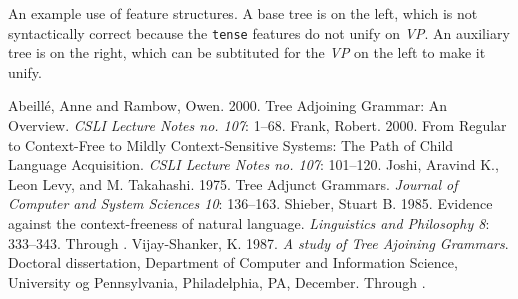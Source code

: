 \documentclass[12pt]{article}
\begin{document}
\begin{Figure}
\begin{center}
\end{center}
\caption{An example use of feature structures.  A base tree is on the
left, which is not syntactically correct because the \texttt{tense}
features do not unify on \textit{VP}.  An auxiliary tree is on the
right, which can be subtituted for the \textit{VP} on the left to make
it unify.}
\end{Figure}

\clearpage

\singlespace
\begin{thebibliography}{4in}
 Abeill\'e, Anne and Rambow, Owen.  2000.  Tree
Adjoining Grammar: An Overview.  \textit{CSLI Lecture Notes no. 107}:
1--68.
 Frank, Robert.  2000.  From Regular to Context-Free
to Mildly Context-Sensitive Systems: The Path of Child Language
Acquisition.  \textit{CSLI Lecture Notes no. 107}: 101--120.
 Joshi, Aravind K., Leon Levy, and M. Takahashi.
1975. Tree Adjunct Grammars. \textit{Journal of Computer and System
Sciences 10}: 136--163.
 Shieber, Stuart B.  1985. Evidence against the
context-freeness of natural language.  \textit{Linguistics and
Philosophy 8}: 333--343.  Through \cite{Abeille-2000}.
 Vijay-Shanker, K. 1987.  \textit{A study of
Tree Ajoining Grammars}.  Doctoral dissertation, Department of Computer
and Information Science, University og Pennsylvania, Philadelphia, PA,
December.  Through \cite{Abeille-2000}.
\end{thebibliography}
\end{document}
